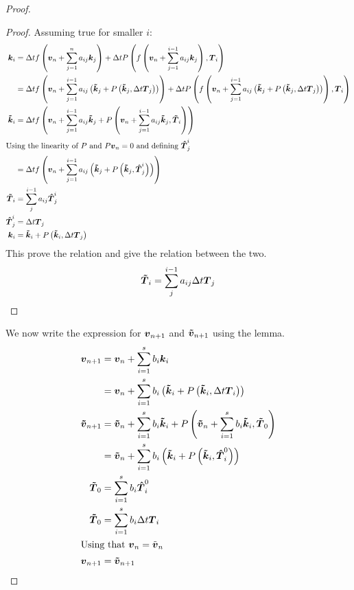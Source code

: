 \begin{proof}
\begin{proof}
Assuming true for smaller $i$:
\begin{align*}
  {\boldsymbol {k}}_{i}&=\Delta tf\left({\boldsymbol {v}}_n+\sum_{j=1}^{n}a_{ij}{\boldsymbol {k}}_{j}\right)+\Delta tP\left(f\left({\boldsymbol {v}}_n+\sum_{j=1}^{i-1}a_{ij}{\boldsymbol {k}}_{j}\right),{\boldsymbol {T}}_{i}\right)\\
  &=\Delta tf\left({\boldsymbol {v}}_n+\sum_{j=1}^{i-1}a_{ij}\left({\boldsymbol {\tilde{k}}}_{j}+P\left({\boldsymbol {\tilde{k}}}_{j},\Delta t {\boldsymbol {T}}_{j}\right)\right)\right)+\Delta tP\left(f\left({\boldsymbol {v}}_n+\sum_{j=1}^{i-1}a_{ij}\left({\boldsymbol {\tilde{k}}}_{j}+P\left({\boldsymbol {\tilde{k}}}_{j},\Delta t {\boldsymbol {T}}_{j}\right)\right)\right),{\boldsymbol {T}}_{i}\right)\\
  {\boldsymbol {\tilde{k}}}_{i}&=\Delta tf\left({\boldsymbol {v}}_n+\sum_{j=1}^{i-1}a_{ij}{\boldsymbol {\tilde{k}}}_{j}+P\left({\boldsymbol {v}}_n+\sum_{j=1}^{i-1}a_{ij}{\boldsymbol {\tilde{k}}}_{j},{\boldsymbol {{\boldsymbol {\tilde{T}}}}}_{i}\right)\right)\\
  \intertext{Using the linearity of $P$ and $P{\boldsymbol {v}}_n=0$ and defining ${\boldsymbol {\hat{T}}}_{j}^i$}
  &=\Delta tf\left({\boldsymbol {v}}_n+\sum_{j=1}^{i-1}a_{ij}\left({\boldsymbol {\tilde{k}}}_{j}+P\left({\boldsymbol {\tilde{k}}}_{j},{\boldsymbol {\hat{T}}}_{j}^{i}\right)\right)\right)\\
  {\boldsymbol {\tilde{T}}}_i&=\sum_{j}^{i-1}a_{ij}{\boldsymbol {\hat{T}}}_{j}^{i}\\
  {\boldsymbol {\hat{T}}}^{i}_{j}&=\Delta t {\boldsymbol {T}}_{j}\\
  {\boldsymbol {k}}_{i}&={\boldsymbol {\tilde{k}}}_{i}+P\left({\boldsymbol {\tilde{k}}}_{i},\Delta t{\boldsymbol {T}}_j\right)
\end{align*}
This prove the relation and give the relation between the two.
\begin{equation}
  {\boldsymbol {\tilde{T}}}_i=\sum_{j}^{i-1}a_{ij}\Delta t {\boldsymbol {T}}_{j}
\end{equation}
\end{proof}

We now write the expression for ${\boldsymbol {v}}_{n+1}$ and ${\boldsymbol {\tilde{v}}}_{n+1}$ using the lemma.
\begin{align*}
{\boldsymbol {v}}_{n+1}&={\boldsymbol {v}}_{n}+\sum_{i=1}^{s}b_{i}{\boldsymbol {k}}_{i}\\
&={\boldsymbol {v}}_{n}+\sum_{i=1}^{s}b_{i}\left({\boldsymbol {\tilde{k}}}_{i}+P\left({\boldsymbol {\tilde{k}}}_{i},\Delta t{\boldsymbol {T}}_{i}\right)\right)\\
{\boldsymbol {\tilde{v}}}_{n+1}&={\boldsymbol {\tilde{v}}}_{n}+\sum_{i=1}^{s}b_{i}{\boldsymbol {\tilde{k}}}_{i}+P\left({\boldsymbol {\tilde{v}}}_{n}+\sum_{i=1}^{s}b_{i}{\boldsymbol {\tilde{k}}}_{i},{\boldsymbol {\tilde{T}}}_{0}\right)\\
&={\boldsymbol {\tilde{v}}}_{n}+\sum_{i=1}^{s}b_{i}\left({\boldsymbol {\tilde{k}}}_{i}+P\left({\boldsymbol {\tilde{k}}}_{i},{\boldsymbol {\hat{T}}}_{i}^{0}\right)\right)\\
{\boldsymbol {\tilde{T}}}_{0}&=\sum_{i=1}^{s}b_{i}{\boldsymbol {\hat{T}}}_{i}^{0}\\
{\boldsymbol {\tilde{T}}}_{0}&=\sum_{i=1}^{s}b_{i}\Delta t {\boldsymbol {T}}_{i}\\
\intertext{Using that ${\boldsymbol {v}}_{n}=\tilde{{\boldsymbol {v}}}_{n}$}
{\boldsymbol {v}}_{n+1}&={\boldsymbol {\tilde{v}}}_{n+1}
\end{align*}

\end{proof}

